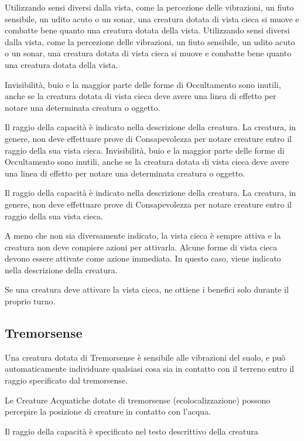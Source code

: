 \documentclass[a4paper,11pt,twoside,openany]{book}
\begin{document}
Utilizzando sensi diversi dalla vista, come la percezione delle vibrazioni, un fiuto sensibile, un udito acuto o un sonar, una creatura dotata di vista cieca si muove e combatte bene quanto una creatura dotata della vista.
Utilizzando sensi diversi dalla vista, come la percezione delle vibrazioni, un fiuto sensibile, un udito acuto o un sonar, una creatura dotata di vista cieca si muove e combatte bene quanto una creatura dotata della vista.

Invisibilità, buio e la maggior parte delle forme di Occultamento sono inutili, anche se la creatura dotata di vista cieca deve avere una linea di effetto per notare una determinata creatura o oggetto.

Il raggio della capacità è indicato nella descrizione della creatura. La creatura, in genere, non deve effettuare prove di Consapevolezza per notare creature entro il raggio della sua vista cieca.
Invisibilità, buio e la maggior parte delle forme di Occultamento sono inutili, anche se la creatura dotata di vista cieca deve avere una linea di effetto per notare una determinata creatura o oggetto.

Il raggio della capacità è indicato nella descrizione della creatura. La creatura, in genere, non deve effettuare prove di Consapevolezza per notare creature entro il raggio della sua vista cieca.

A meno che non sia diversamente indicato, la vista cieca è sempre attiva e la creatura non deve compiere azioni per attivarla. Alcune forme di vista cieca devono essere attivate come azione immediata. In questo caso, viene indicato nella descrizione della creatura.

Se una creatura deve attivare la vista cieca, ne ottiene i benefici solo durante il proprio turno.

\subsection{Tremorsense}
Una creatura dotata di Tremorsense è sensibile alle vibrazioni del suolo, e può automaticamente individuare qualsiasi cosa sia in contatto con il terreno entro il raggio specificato dal tremorsense.

Le Creature Acquatiche dotate di tremorsense (ecolocalizzazione) possono percepire la posizione di creature in contatto con l’acqua.

Il raggio della capacità è specificato nel testo descrittivo della creatura

\pagebreak
\end{document}
